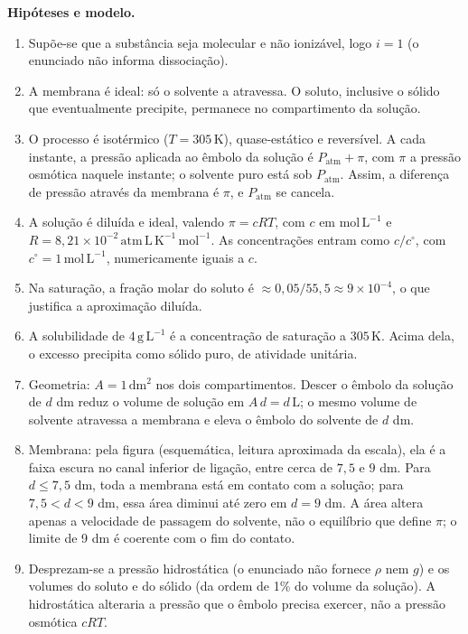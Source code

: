 \documentclass{article}%
\begin{document}
\textbf{Hipóteses e modelo.}
\begin{enumerate}
\item Supõe-se que a substância seja molecular e não ionizável, logo $i=1$ (o enunciado não informa dissociação).
\item A membrana é ideal: só o solvente a atravessa. O soluto, inclusive o sólido que eventualmente precipite, permanece no compartimento da solução.
\item O processo é isotérmico ($T=305\,\mathrm{K}$), quase-estático e reversível. A cada instante, a pressão aplicada ao êmbolo da solução é $P_{\mathrm{atm}}+\pi$, com $\pi$ a pressão osmótica naquele instante; o solvente puro está sob $P_{\mathrm{atm}}$. Assim, a diferença de pressão através da membrana é $\pi$, e $P_{\mathrm{atm}}$ se cancela.
\item A solução é diluída e ideal, valendo $\pi=cRT$, com $c$ em $\mathrm{mol\,L^{-1}}$ e $R=8{,}21\times 10^{-2}\,\mathrm{atm\,L\,K^{-1}\,mol^{-1}}$. As concentrações entram como $c/c^{\circ}$, com $c^{\circ}=1\,\mathrm{mol\,L^{-1}}$, numericamente iguais a $c$.
\item Na saturação, a fração molar do soluto é $\approx 0{,}05/55{,}5\approx 9\times 10^{-4}$, o que justifica a aproximação diluída.
\item A solubilidade de $4\,\mathrm{g\,L^{-1}}$ é a concentração de saturação a $305\,\mathrm{K}$. Acima dela, o excesso precipita como sólido puro, de atividade unitária.
\item Geometria: $A=1\,\mathrm{dm^2}$ nos dois compartimentos. Descer o êmbolo da solução de $d$ dm reduz o volume de solução em $A\,d=d\,\mathrm{L}$; o mesmo volume de solvente atravessa a membrana e eleva o êmbolo do solvente de $d$ dm.
\item Membrana: pela figura (esquemática, leitura aproximada da escala), ela é a faixa escura no canal inferior de ligação, entre cerca de $7{,}5$ e $9$ dm. Para $d\le 7{,}5$ dm, toda a membrana está em contato com a solução; para $7{,}5<d<9$ dm, essa área diminui até zero em $d=9$ dm. A área altera apenas a velocidade de passagem do solvente, não o equilíbrio que define $\pi$; o limite de 9 dm é coerente com o fim do contato.
\item Desprezam-se a pressão hidrostática (o enunciado não fornece $\rho$ nem $g$) e os volumes do soluto e do sólido (da ordem de 1\% do volume da solução). A hidrostática alteraria a pressão que o êmbolo precisa exercer, não a pressão osmótica $cRT$.
\end{enumerate}
\end{document}

